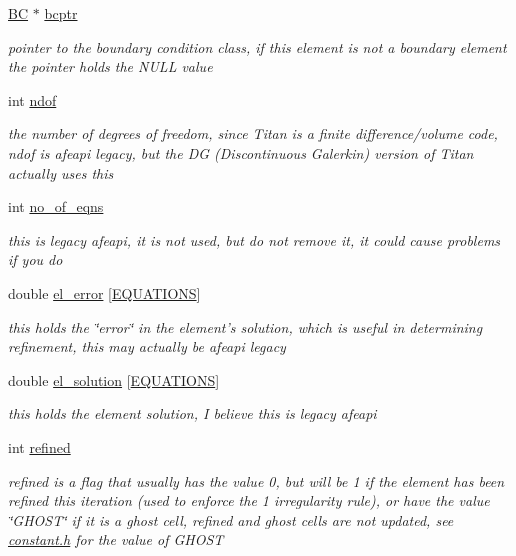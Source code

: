\begin{CompactItemize}
\hyperlink{structBC}{BC} $\ast$ \hyperlink{classElement_r14}{bcptr}
\begin{CompactList}\small\item\em pointer to the boundary condition class, if this element is not a boundary element the pointer holds the NULL value \item\end{CompactList}\item 
int \hyperlink{classElement_r15}{ndof}
\begin{CompactList}\small\item\em the number of degrees of freedom, since Titan is a finite difference/volume code, ndof is afeapi legacy, but the DG (Discontinuous Galerkin) version of Titan actually uses this \item\end{CompactList}\item 
int \hyperlink{classElement_r16}{no\_\-of\_\-eqns}
\begin{CompactList}\small\item\em this is legacy afeapi, it is not used, but do not remove it, it could cause problems if you do \item\end{CompactList}\item 
double \hyperlink{classElement_r17}{el\_\-error} \mbox{[}\hyperlink{constant_8h_a16}{EQUATIONS}\mbox{]}
\begin{CompactList}\small\item\em this holds the \char`\"{}error\char`\"{} in the element's solution, which is useful in determining refinement, this may actually be afeapi legacy \item\end{CompactList}\item 
double \hyperlink{classElement_r18}{el\_\-solution} \mbox{[}\hyperlink{constant_8h_a16}{EQUATIONS}\mbox{]}
\begin{CompactList}\small\item\em this holds the element solution, I believe this is legacy afeapi \item\end{CompactList}\item 
int \hyperlink{classElement_r19}{refined}
\begin{CompactList}\small\item\em refined is a flag that usually has the value 0, but will be 1 if the element has been refined this iteration (used to enforce the 1 irregularity rule), or have the value \char`\"{}GHOST\char`\"{} if it is a ghost cell, refined and ghost cells are not updated, see \hyperlink{constant_8h}{constant.h} for the value of GHOST \item\end{CompactList}\item 

\end{CompactItemize}
